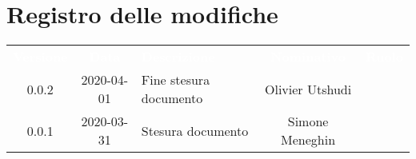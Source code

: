 \section*{Registro delle modifiche}
{
	\centering
	\begin{longtable}{ c c  C{4cm}  c  c }
		\textcolor{white}{\textbf{Versione}} & \textcolor{white}{\textbf{Data}} & \textcolor{white}{\textbf{Descrizione}} & \textcolor{white}{\textbf{Nominativo}} & \textcolor{white}{\textbf{Ruolo}}\\		
		0.0.2 & 2020-04-01 & Fine stesura documento & Olivier Utshudi &\reda{}\\
		0.0.1 & 2020-03-31 & Stesura documento & Simone Meneghin &\reda{}\\		
		
	\end{longtable}

}